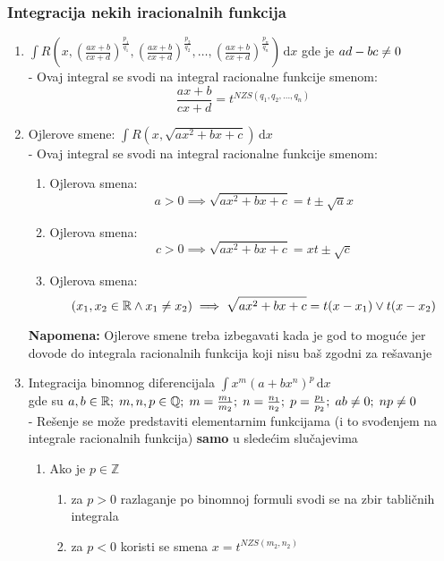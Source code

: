 \subsubsection{Integracija nekih iracionalnih funkcija}
	\begin{enumerate}[label = \textbf{\arabic*.)}]
		\item 
			$\int R\left(x, \left(\frac{ax+b}{cx+d}\right)^{\frac{p_1}{q_1}}, \left(\frac{ax+b}{cx+d}\right)^{\frac{p_2}{q_2}}, \ldots, \left(\frac{ax+b}{cx+d}\right)^{\frac{p_n}{q_n}}\right)\, \mathrm{d}x$
			gde je $ad-bc \centernot = 0$\\
			- Ovaj integral se svodi na integral racionalne funkcije smenom:
			$$\frac{ax+b}{cx+d} = t^{NZS(q_1, q_2, \ldots, q_n)}$$
		\item 
			Ojlerove smene: $\int R\left(x, \sqrt{ax^2+bx+c}\right)\, \mathrm{d}x$ \\
			- Ovaj integral se svodi na integral racionalne funkcije smenom:
			\begin{enumerate}[label=\Roman*]
				\item
					Ojlerova smena:
					$$a>0 \implies \sqrt{ax^2+bx+c}=t\pm\sqrt{a}x$$
				\item
					Ojlerova smena:
					$$c>0 \implies \sqrt{ax^2+bx+c}=xt\pm\sqrt{c}$$
				\item
					Ojlerova smena:
					$$(x_1, x_2 \in \mathbb{R} \land x_1\centernot = x_2) \implies \sqrt{ax^2+bx+c} = t(x-x_1) \lor t(x-x_2)$$
			\end{enumerate}
			\textbf{Napomena:} Ojlerove smene treba izbegavati kada je god to moguće jer dovode do integrala racionalnih funkcija koji nisu baš zgodni za rešavanje
		\item
			Integracija binomnog diferencijala $\int x^m(a+bx^n)^p\, \mathrm{d}x$ \\ 
			gde su $a, b\in \mathbb{R};\; m, n, p \in \mathbb{Q};\; m = \frac{m_1}{m_2};\; n = \frac{n_1}{n_2};\; p = \frac{p_1}{p_2}; \; ab \centernot = 0;\; np\centernot = 0$\\
			- Rešenje se može predstaviti elementarnim funkcijama (i to svođenjem na integrale racionalnih funkcija) \textbf{samo} u sledećim slučajevima
			\begin{enumerate}[label = \Roman*]
				\item 
					Ako je $p \in \mathbb{Z}$
					\begin{enumerate}[label = \alph*)]
						\item za $p>0$ razlaganje po binomnoj formuli svodi se na zbir tabličnih integrala
						\item za $p<0$ koristi se smena $x = t^{NZS(m_2, n_2)}$

\end{enumerate}
\end{enumerate}
\end{enumerate}
